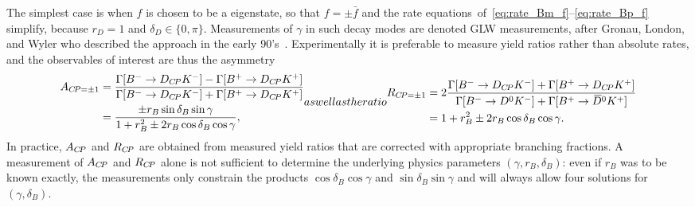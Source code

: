 The simplest case is when $f$ is chosen to be a \CP eigenstate, so that $f=\pm\bar f$ and the rate equations~of~\eqref{eq:rate_Bm_f}--\eqref{eq:rate_Bp_f} simplify, because $r_D=1$ and $\delta_D\in\{0,\pi\}$. Measurements of $\gamma$ in such decay modes are denoted GLW measurements, after  Gronau, London, and Wyler who described the approach in the early 90's~\cite{gronauDeterminingWeakPhase1991,gronauHowDetermineAll1991}. Experimentally it is preferable to measure yield ratios rather than absolute rates, and the observables of interest are thus the \CP asymmetry
\begin{subequations}\label{eq:GLW_observables}
\begin{align}
\begin{split}
    A_{\CP=\pm1} &= \frac{\Gamma[\Bm\to D_{\CP}\Km] - \Gamma[\Bp\to D_{\CP}\Kp]}{\Gamma[\Bm\to D_{\CP}\Km] + \Gamma[\Bp\to D_{\CP}\Kp]} \\
    &= \frac{\pm r_B \sin \delta_B \sin \gamma}{1 + r_B^2 \pm 2 r_B \cos \delta_B \cos \gamma},
\end{split}
\end{align}
as well as the ratio
\begin{align}
\begin{split}
    R_{\CP=\pm 1} &= 2\frac{\Gamma[\Bm\to D_{\CP}\Km] + \Gamma[\Bp\to D_{\CP}\Kp]}{\Gamma[\Bm\to \Dz\Km] + \Gamma[\Bp\to \Dzb\Kp]} \\
    &=  1 + r_B^2 \pm 2 r_B \cos \delta_B \cos \gamma.
\end{split}
\end{align}
\end{subequations}
In practice, $A_{{C\!P}}$ and $R_{{C\!P}}$ are obtained from measured yield ratios that are corrected with appropriate branching fractions. A measurement of $A_{{C\!P}}$ and $R_{{C\!P}}$ alone is not sufficient to determine the underlying physics parameters $(\gamma, r_B, \delta_B)$: even if $r_B$ was to be known exactly, the measurements only constrain the products $\cos \delta_B \cos \gamma$ and $\sin \delta_B \sin \gamma$ and will always allow four solutions for $(\gamma, \delta_B)$. 
